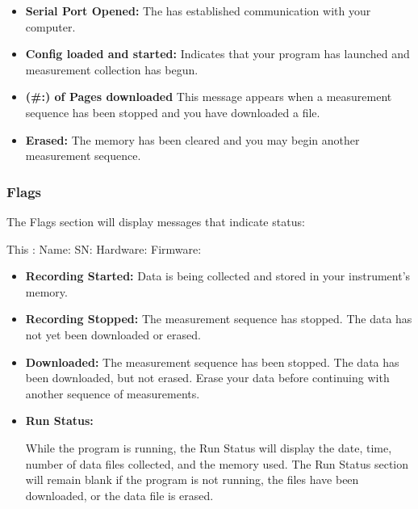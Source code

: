 \begin{itemize}
    \item[] \textbf{Serial Port Opened:}
    \label{Serial}
    The \instType{} has established communication with your computer. 
    
    \item[] \textbf{Config loaded and \instType{} started:}
    Indicates that your program has launched and measurement collection has begun.
    
    \item[] \textbf{(\#:) of Pages downloaded}
    This message appears when a measurement sequence has been stopped and you have downloaded a file. 
    
    \item[] \textbf{Erased:}
    The memory has been cleared and you may begin another measurement sequence.
\end{itemize}


\subsubsection{Flags}

The Flags section will display messages that indicate status:
 
This \instType{}: \quad Name: \quad SN: \quad Hardware: \quad Firmware:

\begin{itemize}
    \item[] \textbf{Recording Started:}
    Data is being collected and stored in your instrument's memory.
    
    \item[] \textbf{Recording Stopped:}
    The measurement sequence has stopped. The data has not yet been downloaded or erased.
    
    \item[] \textbf{Downloaded:}
    The measurement sequence has been stopped.  The data has been downloaded, but not erased. Erase your data before continuing with another sequence of measurements.   
    
    \item[] \textbf{Run Status:}
    
    While the program is running, the Run Status will display the date, time, number of data files collected, and the memory used. The Run Status section will remain blank if the program is not running, the files have been downloaded, or the data file is erased.
\end{itemize}


